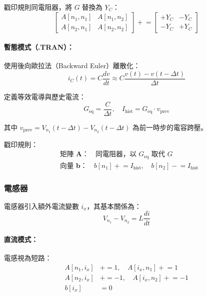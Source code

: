 \documentclass[12pt,a4paper]{article}
\begin{document}
戳印規則同電阻器，將 $G$ 替換為 $Y_C$：
\begin{equation}
\begin{bmatrix}
A[n_1,n_1] & A[n_1,n_2] \\
A[n_2,n_1] & A[n_2,n_2]
\end{bmatrix}
\mathrel{+}=
\begin{bmatrix}
+Y_C & -Y_C \\
-Y_C & +Y_C
\end{bmatrix}
\end{equation}

\paragraph{暫態模式（.TRAN）：} 使用後向歐拉法（Backward Euler）離散化：
\begin{equation}
i_C(t) = C\frac{dv}{dt} \approx C\frac{v(t) - v(t-\Delta t)}{\Delta t}
\end{equation}

\noindent 定義等效電導與歷史電流：
\begin{equation}
G_{\text{eq}} = \frac{C}{\Delta t}, \quad I_{\text{hist}} = G_{\text{eq}} \cdot v_{\text{prev}}
\end{equation}

\noindent 其中 $v_{\text{prev}} = V_{n_1}(t-\Delta t) - V_{n_2}(t-\Delta t)$ 為前一時步的電容跨壓。

戳印規則：
\begin{equation}
\begin{aligned}
&\text{矩陣 } \mathbf{A}：\quad \text{同電阻器，以 } G_{\text{eq}} \text{ 取代 } G \\
&\text{向量 } \mathbf{b}：\quad b[n_1] \mathrel{+}= I_{\text{hist}}, \quad b[n_2] \mathrel{-}= I_{\text{hist}}
\end{aligned}
\end{equation}

\subsubsection{電感器}

電感器引入額外電流變數 $i_x$，其基本關係為：
\begin{equation}
V_{n_1} - V_{n_2} = L\frac{di}{dt}
\end{equation}

\paragraph{直流模式：} 電感視為短路：
\begin{equation}
\begin{aligned}
A[n_1, i_x] &\mathrel{+}= 1, \quad A[i_x, n_1] \mathrel{+}= 1 \\
A[n_2, i_x] &\mathrel{+}= -1, \quad A[i_x, n_2] \mathrel{+}= -1 \\
b[i_x] &= 0
\end{aligned}
\end{equation}
\end{document}
